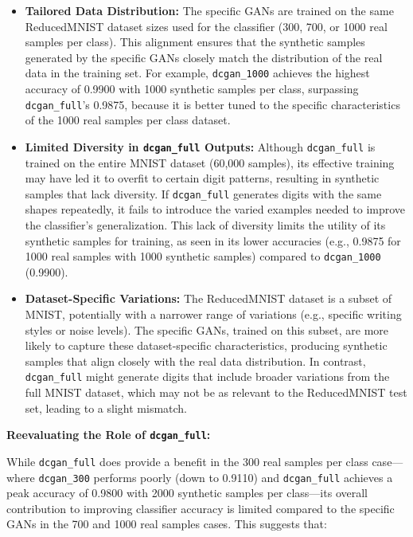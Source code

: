 \documentclass[12pt]{article}
\begin{document}
\begin{itemize}
    \item \textbf{Tailored Data Distribution:} The specific GANs are trained on the same ReducedMNIST dataset sizes used for the classifier (300, 700, or 1000 real samples per class). This alignment ensures that the synthetic samples generated by the specific GANs closely match the distribution of the real data in the training set. For example, \texttt{dcgan\_1000} achieves the highest accuracy of 0.9900 with 1000 synthetic samples per class, surpassing \texttt{dcgan\_full}’s 0.9875, because it is better tuned to the specific characteristics of the 1000 real samples per class dataset.
    
    \item \textbf{Limited Diversity in \texttt{dcgan\_full} Outputs:} Although \texttt{dcgan\_full} is trained on the entire MNIST dataset (60,000 samples), its effective training may have led it to overfit to certain digit patterns, resulting in synthetic samples that lack diversity. If \texttt{dcgan\_full} generates digits with the same shapes repeatedly, it fails to introduce the varied examples needed to improve the classifier’s generalization. This lack of diversity limits the utility of its synthetic samples for training, as seen in its lower accuracies (e.g., 0.9875 for 1000 real samples with 1000 synthetic samples) compared to \texttt{dcgan\_1000} (0.9900).
    
    \item \textbf{Dataset-Specific Variations:} The ReducedMNIST dataset is a subset of MNIST, potentially with a narrower range of variations (e.g., specific writing styles or noise levels). The specific GANs, trained on this subset, are more likely to capture these dataset-specific characteristics, producing synthetic samples that align closely with the real data distribution. In contrast, \texttt{dcgan\_full} might generate digits that include broader variations from the full MNIST dataset, which may not be as relevant to the ReducedMNIST test set, leading to a slight mismatch.
\end{itemize}

\textbf{Reevaluating the Role of \texttt{dcgan\_full}:}

While \texttt{dcgan\_full} does provide a benefit in the 300 real samples per class case—where \texttt{dcgan\_300} performs poorly (down to 0.9110) and \texttt{dcgan\_full} achieves a peak accuracy of 0.9800 with 2000 synthetic samples per class—its overall contribution to improving classifier accuracy is limited compared to the specific GANs in the 700 and 1000 real samples cases. This suggests that:
\end{document}

